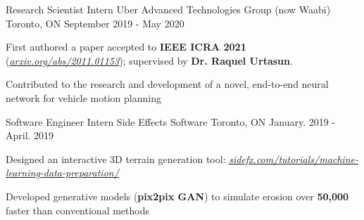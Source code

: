 \begin{cventries}
  \cventry
    {Research Scientist Intern} %
    {Uber Advanced Technologies Group (now Waabi)} %
    {Toronto, ON} %
    {September 2019 - May 2020} %
    {
      \begin{cvitems} %
        \item {First authored a paper accepted to \textbf{IEEE ICRA 2021}} (\href{https://arxiv.org/pdf/2011.01153.pdf}{\underline{\textit{arxiv.org/abs/2011.01153}}});
        supervised by \textbf{Dr. Raquel Urtasun}.
        \item {Contributed to the research and development of a novel, end-to-end
        neural network for vehicle motion planning}
      \end{cvitems}
    }

  \cventry
    {Software Engineer Intern} %
    {Side Effects Software} %
    {Toronto, ON} %
    {January. 2019 - April. 2019} %
    {
      \begin{cvitems} %
        \item {Designed an interactive 3D terrain generation tool: \href{https://www.sidefx.com/tutorials/machine-learning-data-preparation/}{\underline{\textit{sidefx.com/tutorials/machine-learning-data-preparation/}}}}
        \item {Developed generative models (\textbf{pix2pix GAN}) to
        simulate erosion over \textbf{50,000\times} faster than conventional methods}
      \end{cvitems}
    }


\end{cventries}
